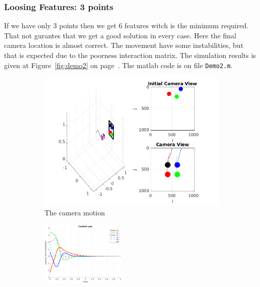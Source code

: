 \documentclass[a4paper,12pt]{article}
\begin{document}
\subsubsection{Loosing Features: 3 points}
If we have only 3 points then we get 6 features witch is the minimum required. That not gurantes that we 
get a good solution in every case. Here the final camera location is almost correct. The movement have some instabilities, but that is expected due to the poorness interaction matrix. The simulation results is given at Figure~\ref{fig:demo2} on page~\pageref{fig:demo2}. The matlab code is on file \texttt{Demo2.m}.
\begin{figure}[tb!]
                 \begin{subfigure}[b]{\textwidth}         
                \centering
                 \includegraphics[width=13cm]{../results/Demo2-simulation.png}
             \caption{The camera motion}
             \vspace{8pt}
                 \end{subfigure}
         \begin{subfigure}[b]{0.32\textwidth}
                \centering
                \includegraphics[height=1.2in]{../results/Demo2-control-law.png}
                 \end{subfigure}

\end{figure}
\end{document}

